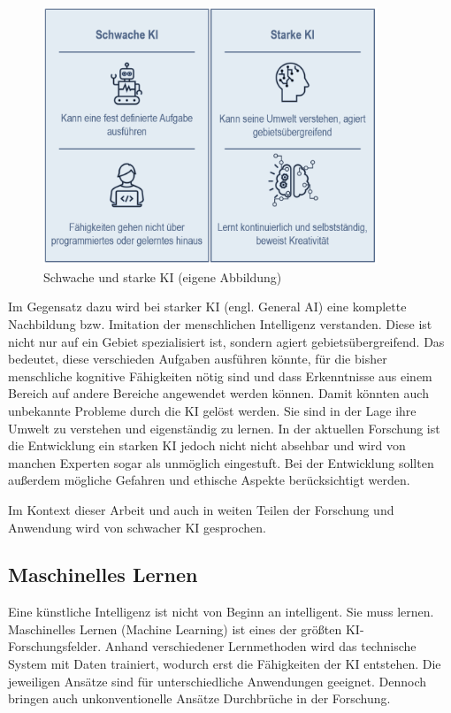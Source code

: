 \documentclass[a4paper,12pt, german]{report}
\begin{document}
\begin{figure}[H]
  \center
 \includegraphics[width=10cm]{images/starkeschwacheKI.png}
  \caption[Schwache und Starke KI]{Schwache und starke KI (eigene Abbildung)}
\end{figure}

Im Gegensatz dazu wird bei starker KI (engl. General AI) eine komplette Nachbildung bzw. Imitation der menschlichen Intelligenz verstanden. Diese ist nicht nur auf ein Gebiet spezialisiert ist, sondern agiert gebietsübergreifend. Das bedeutet, diese verschieden Aufgaben ausführen könnte, für die bisher menschliche kognitive Fähigkeiten nötig sind und dass Erkenntnisse aus einem Bereich auf andere Bereiche angewendet werden können. Damit könnten auch unbekannte Probleme durch die KI gelöst werden. Sie sind in der Lage ihre Umwelt zu verstehen und eigenständig zu lernen. In der aktuellen Forschung ist die Entwicklung ein starken KI jedoch nicht nicht absehbar und wird von manchen Experten sogar als unmöglich eingestuft. Bei der Entwicklung sollten außerdem mögliche Gefahren und ethische Aspekte berücksichtigt werden. 



Im Kontext dieser Arbeit und auch in weiten Teilen der Forschung und Anwendung wird von schwacher KI gesprochen. \cite{01}\cite{15}

\subsection{Maschinelles Lernen}

Eine künstliche Intelligenz ist nicht von Beginn an intelligent. Sie muss lernen. Maschinelles Lernen (Machine Learning) ist eines der größten KI-Forschungsfelder. Anhand verschiedener Lernmethoden wird das technische System mit Daten trainiert, wodurch erst die Fähigkeiten der KI entstehen. Die jeweiligen Ansätze sind für unterschiedliche Anwendungen geeignet. Dennoch bringen auch unkonventionelle Ansätze Durchbrüche in der Forschung. \newline
\end{document}
